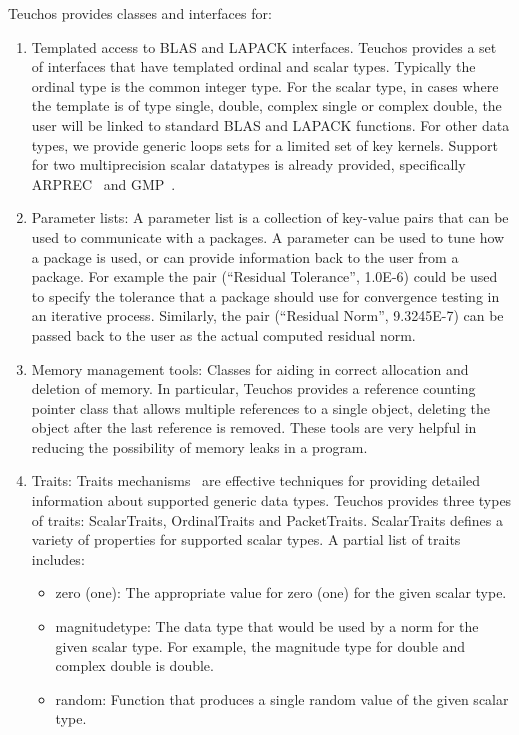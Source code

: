 \documentclass[12pt,relax]{TPA}
\begin{document}
Teuchos provides classes and interfaces for:
\begin{enumerate}
\item Templated access to BLAS and LAPACK interfaces.  Teuchos
provides a set of interfaces that
have templated ordinal and scalar types.  Typically the ordinal type
is the common integer type.  For the scalar type, in cases
where the template is of type single, double, complex single or
complex double, the user will be linked to standard BLAS and LAPACK
functions.  For other data types, we provide generic loops sets for a
limited set of key kernels.  Support for two multiprecision scalar datatypes
is already provided, specifically ARPREC~\cite{ARPREC} and GMP~\cite{GMP}.

\item Parameter lists:  A parameter list is a collection of key-value
pairs that can be used to communicate with a packages.  A parameter
can be used to tune how a package is used, or can provide information
back to the user from a package.  For example the pair (``Residual Tolerance'',
1.0E-6) could be used to specify the tolerance that a package should
use for convergence testing in an iterative process.  Similarly, the
pair (``Residual Norm'', 9.3245E-7) can be passed back to the user as
the actual computed residual norm.  

\item Memory management tools:  Classes for aiding in correct allocation 
and deletion of memory.  In particular, Teuchos provides a reference counting pointer class that 
allows multiple references to a single object, deleting the object after the last
reference is removed.  These tools are very helpful in reducing the possibility of
memory leaks in a program.

\item Traits: Traits mechanisms~\cite{MyersTraits} are effective techniques
for providing detailed information about supported generic data types.
Teuchos provides three types of traits: ScalarTraits, OrdinalTraits
and PacketTraits.
ScalarTraits defines a variety of properties for supported scalar
types.  A partial list of traits includes:
\begin{itemize}
\item zero (one): The appropriate value for zero (one) for the given
scalar type.
\item magnitudetype: The data type that would be used by a norm for
the given scalar type.  For example, the magnitude type for double and
complex double is double.
\item random: Function that produces a single random value of the
given scalar type.
\end{itemize}


\end{enumerate}
\end{document}
